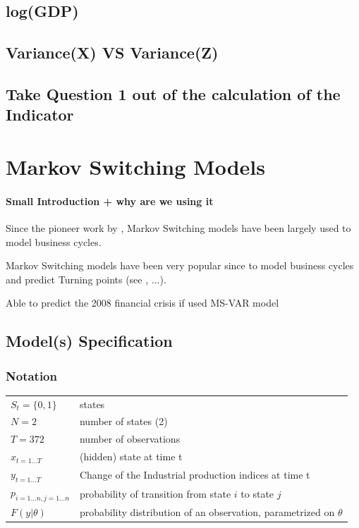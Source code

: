 \documentclass[12pt,a4paper,oneside]{book}
\begin{document}
\newpage

\section{log(GDP)}


\section{Variance(X) VS Variance(Z)}

\section{Take Question 1 out of the calculation of the Indicator}

\chapter{Markov Switching Models}


\subsubsection{Small Introduction + why are we using it}

Since the pioneer work by \cite{hamilton_new_1989}, Markov Switching models have been largely used to model business cycles.


Markov Switching models have been very popular since \cite{hamilton_new_1989} to model business cycles and predict Turning points (see \cite{duprey_how_2017}, ...).

Able to predict the 2008 financial crisis if used MS-VAR model \cite{gadea_rivas_failure_2015}




\section{Model(s) Specification}

\subsection{Notation}

\begin{tabular}{l l}
    $S_t = \{0, 1\}$&   states        \\
    $N = 2$         &   number of states (2) \\
    $T = 372 $            & 	number of observations  \\
    $x_{t=1\dots T}$ & (hidden) state at time t \\
    $y_{t=1\dots T}$ 	& Change of the Industrial production indices at time t \\
    $p_{i=1\dots n,j=1\dots n}$ & probability of transition from state $i$ to state $j$ \\
    $F(y|\theta )$	&  probability distribution of an observation, parametrized on $\theta$ \\
\end{tabular}
\end{document}
